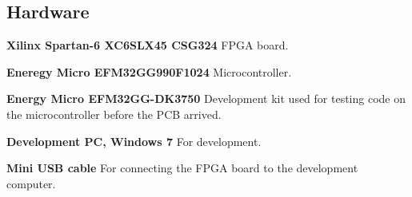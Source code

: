 \subsection{Hardware}
\begin{description}
\item{\textbf{Xilinx Spartan-6 XC6SLX45 CSG324}}
    FPGA board.
\item{\textbf{Eneregy Micro EFM32GG990F1024}}
    Microcontroller.
\item{\textbf{Energy Micro EFM32GG-DK3750}}
    Development kit used for testing code on the microcontroller before the PCB arrived.
\item{\textbf{Development PC, Windows 7}}
    For development.
\item{\textbf{Mini USB cable}}
    For connecting the FPGA board to the development computer.
\end{description}
